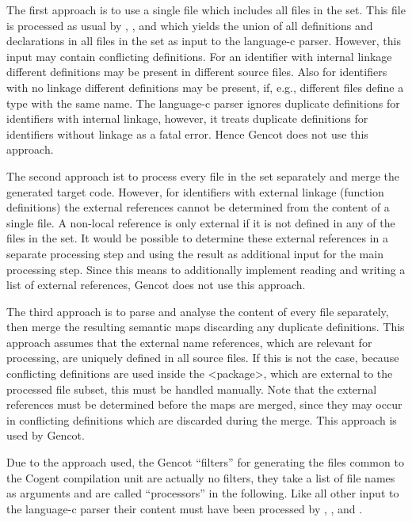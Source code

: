 The first approach is to use a single file which includes all files in the set. This file is processed as usual by
, , and  which yields the union of all definitions
and declarations in all files in the set as input to the language-c parser. However, this input may contain conflicting
definitions. For an identifier with internal linkage different definitions may be present in different source files.
Also for identifiers with no linkage different definitions may be present, if, e.g., different  files define
a type with the same name. The language-c parser ignores duplicate definitions for identifiers with internal linkage,
however, it treats duplicate definitions for identifiers without linkage as a fatal error. Hence Gencot does not use
this approach.

The second approach ist to process every file in the set separately and merge the generated target code. However, for
identifiers with external linkage (function definitions) the external references cannot be determined from the content
of a single file. A non-local reference is only external if it is not defined in any of the files in the set. It would
be possible to determine these external references in a separate processing step and using the result as additional input
for the main processing step. Since this means to additionally implement reading and writing a list of external references,
Gencot does not use this approach.

The third approach is to parse and analyse the content of every file separately, then merge the resulting semantic maps
discarding any duplicate definitions. This approach assumes that the external name references, which are relevant for
processing, are uniquely defined in all source files. If this is not the case, because conflicting definitions are used
inside the <package>, which are external to the processed file subset, this must be handled manually. Note that the
external references must be determined before the maps are merged, since they may occur in conflicting definitions
which are discarded during the merge. This approach is used by Gencot.

Due to the approach used, the Gencot ``filters'' for generating the files common to the Cogent compilation unit are
actually no filters, they take a list of file names as arguments and are called ``processors'' in the following.
Like all other input to the language-c parser their
content must have been processed by , , and .

